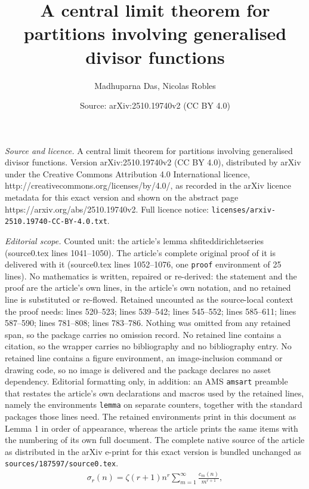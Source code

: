 \documentclass[10pt,a4paper]{amsart}
\title{A central limit theorem for partitions involving generalised divisor functions}
\author{Madhuparna Das, Nicolas Robles}
\date{Source: arXiv:2510.19740v2 (CC BY 4.0)}
\begin{document}
\maketitle

\noindent\emph{Source and licence.} A central limit theorem for partitions involving generalised divisor functions. Version arXiv:2510.19740v2 (CC BY 4.0), distributed by arXiv under the Creative Commons Attribution 4.0 International licence, http://creativecommons.org/licenses/by/4.0/, as recorded in the arXiv licence metadata for this exact version and shown on the abstract page https://arxiv.org/abs/2510.19740v2. Full licence notice: \texttt{licenses/arxiv-2510.19740-CC-BY-4.0.txt}.\par\smallskip

\noindent\textit{Editorial scope.} Counted unit: the article's lemma shfiteddirichletseries (source0.tex lines 1041--1050). The article's complete original proof of it is delivered with it (source0.tex lines 1052--1076, one \texttt{proof} environment of 25 lines). No mathematics is written, repaired or re-derived: the statement and the proof are the article's own lines, in the article's own notation, and no retained line is substituted or re-flowed.  Retained uncounted as the source-local context the proof needs: lines 520--523; lines 539--542; lines 545--552; lines 585--611; lines 587--590; lines 781--808; lines 783--786.  Nothing was omitted from any retained span, so the package carries no omission record.  No retained line contains a citation, so the wrapper carries no bibliography and no bibliography entry.  No retained line contains a figure environment, an image-inclusion command or drawing code, so no image is delivered and the package declares no asset dependency.  Editorial formatting only, in addition: an AMS \texttt{amsart} preamble that restates the article's own declarations and macros used by the retained lines, namely the environments \texttt{lemma} on separate counters, together with the standard packages those lines need.  The retained environments print in this document as Lemma 1 in order of appearance, whereas the article prints the same items with the numbering of its own full document.  The complete native source of the article as distributed in the arXiv e-print for this exact version is bundled unchanged as \texttt{sources/187597/source0.tex}.
\begin{align}\label{kthdivisoridentity}
\sigma_r(n)
=\zeta(r+1)n^r\sum_{m=1}^{\infty}\frac{c_m(n)}{m^{r+1}},
\end{align} 
\end{document}
